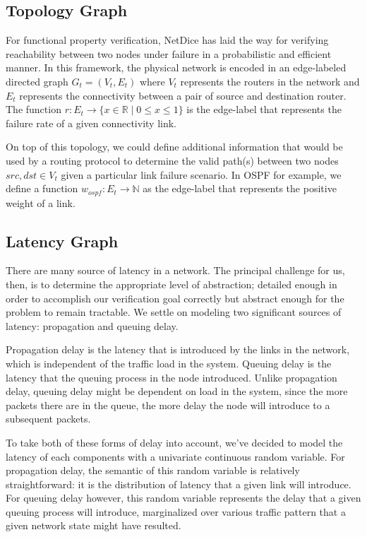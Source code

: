 \documentclass[10pt,sigconf,letterpaper,anonymous,nonacm]{acmart}
\begin{document}
\subsection{Topology Graph}
For functional property verification, NetDice \cite{steffen2020probabilistic} 
has laid the way for verifying reachability between two nodes under failure in a 
probabilistic and efficient manner. 
In this framework, the physical network is encoded in an edge-labeled directed graph 
$G_t = (V_t, E_t)$ where $V_t$ represents the routers in the network and 
$E_t$ represents the connectivity between a pair of source and destination router. 
The function $r: E_t \rightarrow \{x \in \mathbb{R} \mid 0 \le x \le 1\}$ is the 
edge-label that represents the failure rate of a given connectivity link.

On top of this topology, we could define additional information that would be used
by a routing protocol to determine the valid path(s) between two nodes 
$src, dst \in V_t$ given a particular link failure scenario. 
In OSPF for example, we define a function $w_{ospf}: E_t \rightarrow \mathbb{N}$ as the edge-label 
that represents the positive weight of a link.


\subsection{Latency Graph}
There are many source of latency in a network. 
The principal challenge for us, then, is to determine the appropriate level of abstraction; 
detailed enough in order to accomplish our verification goal correctly but 
abstract enough for the problem to remain tractable. 
We settle on modeling two significant sources of latency: propagation and 
queuing delay.

Propagation delay is the latency that is introduced by the links in the network, which is 
independent of the traffic load in the system.
Queuing delay is the latency that the queuing process in the node introduced. 
Unlike propagation delay, queuing delay might be dependent on load in the system, since the more 
packets there are in the queue, the more delay the node will introduce to a subsequent packets.

To take both of these forms of delay into account, we've decided to model the latency of each
components with a univariate continuous random variable.
For propagation delay, the semantic of this random variable is relatively straightforward: it is 
the distribution of latency that a given link will introduce.
For queuing delay however, this random variable represents the delay that a given queuing process 
will introduce, marginalized over various traffic pattern that a given network state might have 
resulted.
\end{document}
